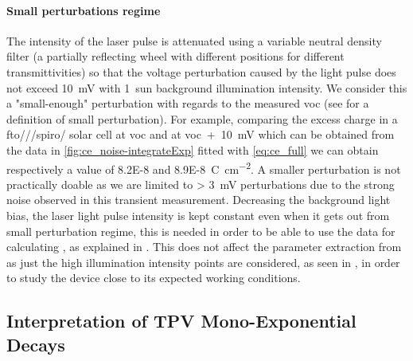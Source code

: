 	\paragraph{Small perturbations regime}\label{tpv_perturbation}
	The intensity of the laser pulse is attenuated using a variable neutral density filter (a partially reflecting wheel with different positions for different transmittivities) so that the voltage perturbation caused by the light pulse does not exceed \SI{10}{\mV} with 1~sun background illumination intensity.
	We consider this a "small\hyp{}enough" perturbation with regards to the measured \gls{voc} (see  for a definition of small perturbation).
	For example, comparing the excess charge in a \gls{fto}\-/\-/\-/\gls{spiro}\-/ solar cell at \gls{voc} and at \gls{voc}~+~\SI{10}{\mV} which can be obtained from the data in \cref{fig:ce_noise-integrateExp} fitted with \cref{eq:ce_full} we can obtain respectively a value of \SI{8.2E-8}{} and \SI{8.9E-8}{\coulomb\per\square\cm}.
	A smaller perturbation is not practically doable as we are limited to \SI{> 3}{\mV} perturbations due to the strong noise observed in this transient measurement.
	Decreasing the background light bias, the laser light pulse intensity is kept constant even when it gets out from small perturbation regime, this is needed in order to be able to use the  data for calculating , as explained in .
	This does not affect the parameter extraction from  as just the high illumination intensity points are considered, as seen in , in order to study the device close to its expected working conditions.

	\subsection{Interpretation of TPV Mono\hyp{}Exponential Decays}

